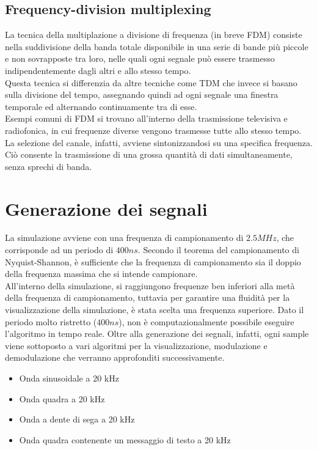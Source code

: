 \documentclass{article}
\begin{document}
\subsection{Frequency-division multiplexing}
La tecnica della multiplazione a divisione di frequenza (in breve FDM) consiste nella suddivisione della banda totale disponibile
in una serie di bande più piccole e non sovrapposte tra loro, nelle quali ogni segnale può essere trasmesso indipendentemente
dagli altri e allo stesso tempo.\\
Questa tecnica si differenzia da altre tecniche come TDM che invece si basano sulla divisione del tempo, assegnando quindi
ad ogni segnale una finestra temporale ed alternando continuamente tra di esse.\\
Esempi comuni di FDM si trovano all'interno della trasmissione televisiva e radiofonica, in cui frequenze diverse vengono
trasmesse tutte allo stesso tempo. La selezione del canale, infatti, avviene sintonizzandosi su una specifica frequenza.
Ciò consente la trasmissione di una grossa quantità di dati simultaneamente, senza sprechi di banda.

\section{Generazione dei segnali}
La simulazione avviene con una frequenza di campionamento di $2.5 MHz$, che corrisponde ad un periodo di $400 ns$. Secondo il
teorema del campionamento di Nyquist-Shannon, è sufficiente che la frequenza di campionamento sia il doppio della frequenza
massima che si intende campionare.\\
All'interno della simulazione, si raggiungono frequenze ben inferiori alla metà della frequenza di campionamento, tuttavia
per garantire una fluidità per la visualizzazione della simulazione, è stata scelta una frequenza superiore. Dato il periodo
molto ristretto ($400 ns$), non è computazionalmente possibile eseguire l'algoritmo in tempo reale. Oltre
alla generazione dei segnali, infatti, ogni sample viene sottoposto a vari algoritmi per la visualizzazione,
modulazione e demodulazione che verranno approfonditi successivamente.\\

\begin{itemize}
    \item Onda sinusoidale a 20 kHz
    \item Onda quadra a 20 kHz
    \item Onda a dente di sega a 20 kHz
    \item Onda quadra contenente un messaggio di testo a 20 kHz
\end{itemize}
\end{document}
